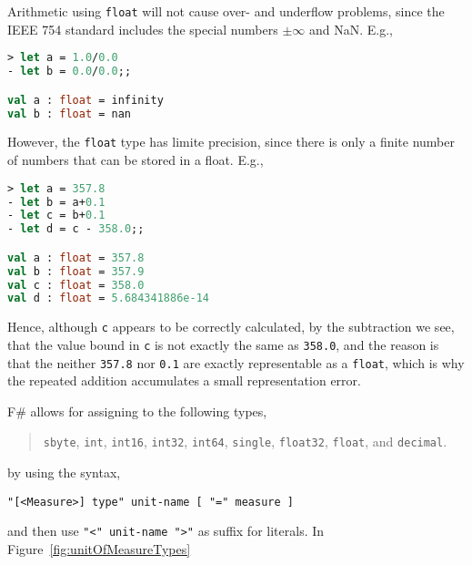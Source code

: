 Arithmetic using \lstinline|float| will not cause over- and underflow problems, since the IEEE 754 standard includes the special numbers $\pm\infty$ and NaN. E.g.,
%
\begin{lstlisting}[language=fsharp,caption={fsharpi, floating point numbers include infinity and Not-a-Number}]
> let a = 1.0/0.0  
- let b = 0.0/0.0;;

val a : float = infinity
val b : float = nan
\end{lstlisting}
However, the \lstinline|float| type has limite precision, since there is only a finite number of numbers that can be stored in a float. E.g.,
%
\begin{lstlisting}[language=fsharp,caption={fsharpi, floating point arithmatic has finite precision.}]
> let a = 357.8      
- let b = a+0.1      
- let c = b+0.1      
- let d = c - 358.0;;

val a : float = 357.8
val b : float = 357.9
val c : float = 358.0
val d : float = 5.684341886e-14
\end{lstlisting}
Hence, although \lstinline|c| appears to be correctly calculated, by the subtraction we see, that the value bound in \lstinline|c| is not exactly the same as \lstinline|358.0|, and the reason is that the neither \lstinline|357.8| nor \lstinline|0.1| are exactly representable as a \lstinline|float|, which is why the repeated addition accumulates a small representation error.

F\# allows for assigning  to the following types,
\begin{quote}
  \mbox{\lstinline{sbyte},}
  \mbox{\lstinline{int},}
  \mbox{\lstinline{int16},}
  \mbox{\lstinline{int32},}
  \mbox{\lstinline{int64},}
  \mbox{\lstinline{single},}
  \mbox{\lstinline{float32},}
  \mbox{\lstinline{float},} and
  \mbox{\lstinline{decimal}.}
\end{quote}
by using the syntax,
%
\begin{lstlisting}[language=EBNF]
"[<Measure>] type" unit-name [ "=" measure ]
\end{lstlisting}
%
and then use \lstinline[language=EBNF]|"<" unit-name ">"| as suffix for literals. In Figure~\ref{fig:unitOfMeasureTypes}

